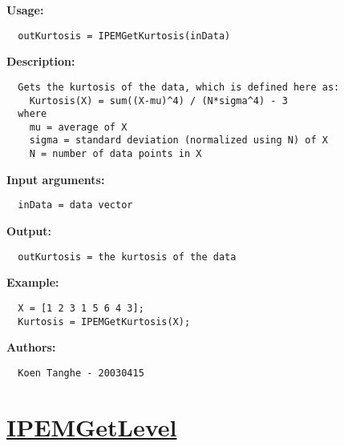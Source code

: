 \textbf{Usage:}
\begin{verbatim}  outKurtosis = IPEMGetKurtosis(inData)

\end{verbatim}
\textbf{Description:}
\begin{verbatim}  Gets the kurtosis of the data, which is defined here as:
    Kurtosis(X) = sum((X-mu)^4) / (N*sigma^4) - 3
  where
    mu = average of X
    sigma = standard deviation (normalized using N) of X
    N = number of data points in X

\end{verbatim}
\textbf{Input arguments:}
\begin{verbatim}  inData = data vector

\end{verbatim}
\textbf{Output:}
\begin{verbatim}  outKurtosis = the kurtosis of the data

\end{verbatim}
\textbf{Example:}
\begin{verbatim}  X = [1 2 3 1 5 6 4 3];
  Kurtosis = IPEMGetKurtosis(X);

\end{verbatim}
\textbf{Authors:}
\begin{verbatim}  Koen Tanghe - 20030415
\end{verbatim}


\newpage
\section*{\hyperlink{Concepts:IPEMGetLevel}{IPEMGetLevel}}
\hypertarget{FuncRef:IPEMGetLevel}{}

